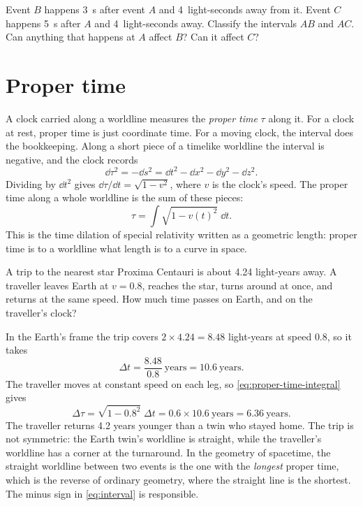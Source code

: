 \begin{checkpoint}
Event $B$ happens \SI{3}{\second} after event $A$ and 4~light-seconds
away from it. Event $C$ happens \SI{5}{\second} after $A$ and
4~light-seconds away. Classify the intervals $AB$ and $AC$. Can
anything that happens at $A$ affect $B$? Can it affect $C$?
\end{checkpoint}

\section{Proper time}\label{sec:proper-time}

A clock carried along a worldline measures the \emph{proper time} $\tau$ along
it. For a clock at rest, proper time is just coordinate time. For a moving
clock, the interval does the bookkeeping. Along a short piece of a timelike
worldline the interval is negative, and the clock records
\begin{equation}
  \dd\tau^{2} = -\dd s^{2} = \dd t^{2} - \dd x^{2} - \dd y^{2} - \dd z^{2}.
  \label{eq:proper-time}
\end{equation}
Dividing by $\dd t^{2}$ gives $\dd\tau/\dd t = \sqrt{1 - v^{2}}$, where $v$ is the
clock's speed. The proper time along a whole worldline is the sum of these
pieces:
\begin{equation}
  \tau = \int \sqrt{1 - v(t)^{2}}\;\dd t .
  \label{eq:proper-time-integral}
\end{equation}
This is the time dilation of special relativity written as a geometric length:
proper time is to a worldline what length is to a curve in space.

\begin{example}{A trip to the nearest star}\label{ex:twin}
Proxima Centauri is about 4.24 light-years away. A traveller leaves Earth at
$v = 0.8$, reaches the star, turns around at once, and returns at the same
speed. How much time passes on Earth, and on the traveller's clock?

\solution In the Earth's frame the trip covers $2 \times 4.24 = 8.48$
light-years at speed $0.8$, so it takes
\begin{equation*}
  \Delta t = \frac{8.48}{0.8}\ \text{years} = 10.6\ \text{years}.
\end{equation*}
The traveller moves at constant speed on each leg, so
\cref{eq:proper-time-integral} gives
\begin{equation*}
  \Delta\tau = \sqrt{1 - 0.8^{2}}\;\Delta t = 0.6 \times 10.6\ \text{years}
  = 6.36\ \text{years}.
\end{equation*}
\discussion The traveller returns 4.2 years younger than a twin who stayed
home. The trip is not symmetric: the Earth twin's worldline is straight, while
the traveller's worldline has a corner at the turnaround. In the geometry of
spacetime, the straight worldline between two events is the one with the
\emph{longest} proper time, which is the reverse of ordinary geometry, where the
straight line is the shortest. The minus sign in \cref{eq:interval} is
responsible.
\end{example}

